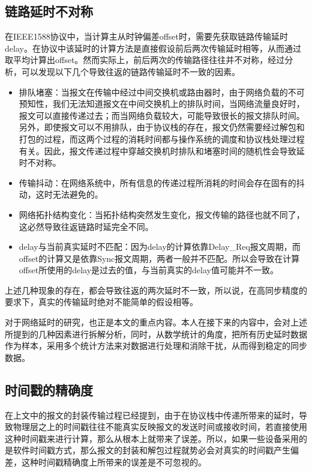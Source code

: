 \subsection{链路延时不对称}
\label{sec:1588_problem_1}
在IEEE1588协议中，当计算主从时钟偏差offset时，需要先获取链路传输延时delay。在协议中该延时的计算方法是直接假设前后两次传输延时相等，从而通过取平均计算出offset。然而实际上，前后两次的传输路径往往并不对称，经过分析，可以发现以下几个导致往返的链路传输延时不一致的因素。
\begin{itemize}[noitemsep,topsep=0pt,parsep=0pt,partopsep=0pt]
	\item 排队堵塞：当报文在传输中经过中间交换机或路由器时，由于网络负载的不可预知性，我们无法知道报文在中间交换机上的排队时间，当网络流量良好时，报文可以直接传递过去；而当网络负载较大，可能导致很长的报文排队时间。另外，即使报文可以不用排队，由于协议栈的存在，报文仍然需要经过解包和打包的过程，而这两个过程的消耗时间都与操作系统的调度和协议栈处理过程有关。因此，报文传递过程中穿越交换机时排队和堵塞时间的随机性会导致延时不对称。
	\item 传输抖动：在网络系统中，所有信息的传递过程所消耗的时间会存在固有的抖动，这时无法避免的。
	\item 网络拓扑结构变化：当拓扑结构突然发生变化，报文传输的路径也就不同了，这必然导致往返链路时延完全不同。
	\item delay与当前真实延时不匹配：因为delay的计算依靠Delay\_Req报文周期，而offset的计算又是依靠Sync报文周期，两者一般并不匹配。所以会导致在计算offset所使用的delay是过去的值，与当前真实的delay值可能并不一致。
\end{itemize}

上述几种现象的存在，都会导致往返的两次延时不一致，所以说，在高同步精度的要求下，真实的传输延时绝对不能简单的假设相等。

对于网络延时的研究，也正是本文的重点内容。本人在接下来的内容中，会对上述所提到的几种因素进行拆解分析，同时，从数学统计的角度，把所有历史延时数据作为样本，采用多个统计方法来对数据进行处理和消除干扰，从而得到稳定的同步数据。

\subsection{时间戳的精确度}
\label{sec:1588_problem_2}
在上文中的报文的封装传输过程已经提到，由于在协议栈中传递所带来的延时，导致物理层之上的时间戳往往不能真实反映报文的发送时间或接收时间，若直接使用这种时间戳来进行计算，那么从根本上就带来了误差。所以，如果一些设备采用的是软件时间戳方式，那么报文的封装和解包过程就势必会对真实的时间戳产生偏差，这种时间戳精确度上所带来的误差是不可忽视的。

